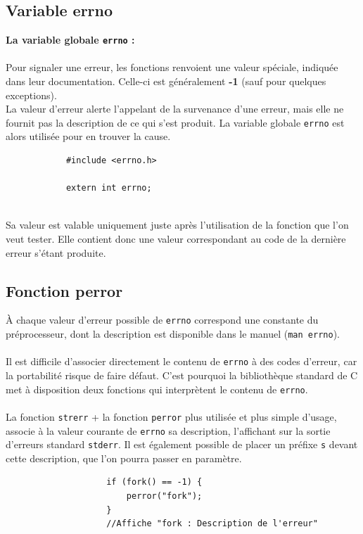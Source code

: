 	\subsection{Variable errno}
		\begin{frame}[containsverbatim]
			\textbf{La variable globale \lstinline!errno! :}
			\\~\\
			Pour signaler une erreur, les fonctions renvoient une valeur spéciale, indiquée dans leur documentation. Celle-ci est généralement \textbf{-1} (sauf pour quelques exceptions).\\
			La valeur d'erreur alerte l'appelant de la survenance d'une erreur, mais elle ne fournit pas la description de ce qui s'est produit. La variable globale \lstinline!errno! est alors utilisée pour en trouver la cause.
			~\\
			\begin{lstlisting}
			#include <errno.h>

			extern int errno;
			\end{lstlisting}
			~\\
			Sa valeur est valable uniquement juste après l'utilisation de la fonction que l'on veut tester. Elle contient donc une valeur correspondant au code de la dernière erreur s'étant produite.
			
		\end{frame}	
	
	\subsection{Fonction perror}	
		\begin{frame}[containsverbatim]
			À chaque valeur d'erreur possible de \lstinline!errno! correspond une constante du préprocesseur, dont la description est disponible dans le manuel (\lstinline!man errno!).
			\\~\\
			Il est difficile d'associer directement le contenu de \lstinline!errno! à des codes d'erreur, car la portabilité risque de faire défaut. C'est pourquoi la bibliothèque standard de C met à disposition deux fonctions qui interprètent le contenu de \lstinline!errno!.
			\\~\\
			La fonction \lstinline!strerr! + la fonction \lstinline!perror! plus utilisée et plus simple d'usage, associe à la valeur courante de \lstinline!errno! sa description, l'affichant sur la sortie d'erreurs standard \lstinline!stderr!. Il est également possible de placer un préfixe \lstinline!s! devant cette description, que l'on pourra passer en paramètre.
			~\\
				\begin{lstlisting}
					if (fork() == -1) {
						perror("fork");
					}
					//Affiche "fork : Description de l'erreur"
				\end{lstlisting}
		\end{frame}		
		
